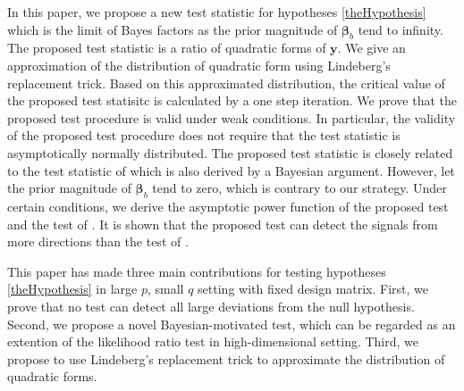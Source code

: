 \documentclass[smallextended]{svjour3}       %
\DeclareMathOperator{\myE}{E}
\DeclareMathOperator{\myVar}{Var}
\newcommand{\By}{\mathbf{y}}    \newcommand{\Bz}{\mathbf{z}}
\newcommand{\bfsym}[1]{\ensuremath{\boldsymbol{#1}}}
\def\bbeta{\bfsym \beta}
\begin{document}
In this paper, we propose a new test statistic for hypotheses \eqref{theHypothesis} which is the limit of Bayes factors as the prior magnitude of $\bbeta_b$ tend to infinity.
The proposed test statistic is a ratio of quadratic forms of $\By$.
We give an approximation of the distribution of quadratic form using Lindeberg's replacement trick.
Based on this approximated distribution, the critical value of the proposed test statisitc is calculated by a one step iteration.
We prove that the proposed test procedure is valid under weak conditions.
In particular, the validity of the proposed test procedure does not require that the test statistic is asymptotically normally distributed.
The proposed test statistic is closely related to the test statistic of \cite{Goeman2006} which is also derived by a Bayesian argument.
However, \cite{Goeman2006} let the prior magnitude of $\bbeta_b$ tend to zero, which is contrary to our strategy.
Under certain conditions, we derive the asymptotic power function of the proposed test and the test of \cite{Goeman2006}.
It is shown that the proposed test can detect the signals from more directions than the test of \cite{Goeman2006}.


This paper has made three main contributions for testing hypotheses \eqref{theHypothesis} in large $p$, small $q$ setting with fixed design matrix.
First, we prove that no test can detect all large deviations from the null hypothesis.
Second, we propose a novel Bayesian-motivated test, which can be regarded as an extention of the likelihood ratio test in high-dimensional setting.
Third, we propose to use Lindeberg's replacement trick to approximate the distribution of quadratic forms.
\end{document}
